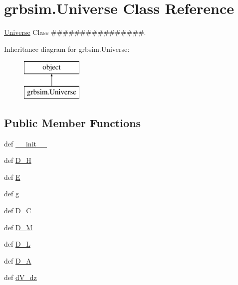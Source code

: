 \hypertarget{classgrbsim_1_1_universe}{\section{grbsim.\-Universe Class Reference}
\label{classgrbsim_1_1_universe}
}


\hyperlink{classgrbsim_1_1_universe}{Universe} Class \#\#\#\#\#\#\#\#\#\#\#\#\#\#\#\#.  


Inheritance diagram for grbsim.\-Universe\-:\begin{figure}[H]
\begin{center}
\leavevmode
\includegraphics[height=2.000000cm]{d2/ddc/classgrbsim_1_1_universe}
\end{center}
\end{figure}
\subsection*{Public Member Functions}
\begin{DoxyCompactItemize}
\item 
def \hyperlink{classgrbsim_1_1_universe_a477782a9799e593606c8b93e32979575}{\-\_\-\-\_\-init\-\_\-\-\_\-}
\item 
def \hyperlink{classgrbsim_1_1_universe_a1ee331ee5b8c47d649975c1b830cb97a}{D\-\_\-\-H}
\item 
def \hyperlink{classgrbsim_1_1_universe_af182961238cc8a6cf74f967ace71fac3}{E}
\item 
def \hyperlink{classgrbsim_1_1_universe_a1520f08536b821def06948b39cf18427}{g}
\item 
def \hyperlink{classgrbsim_1_1_universe_afd74ef68d25363c13f2c94e96b2a8a8d}{D\-\_\-\-C}
\item 
def \hyperlink{classgrbsim_1_1_universe_ac6e2184d18fb119538df164a647fe13b}{D\-\_\-\-M}
\item 
def \hyperlink{classgrbsim_1_1_universe_a09d15f75aedac6a8b1375ac233b8c247}{D\-\_\-\-L}
\item 
def \hyperlink{classgrbsim_1_1_universe_ad58fe82edeb3e353f6eb9012f6c35ac0}{D\-\_\-\-A}
\item 
def \hyperlink{classgrbsim_1_1_universe_ac7ba7d8a9e9cd0c6fe8ce792e939752c}{d\-V\-\_\-dz}
\end{DoxyCompactItemize}
